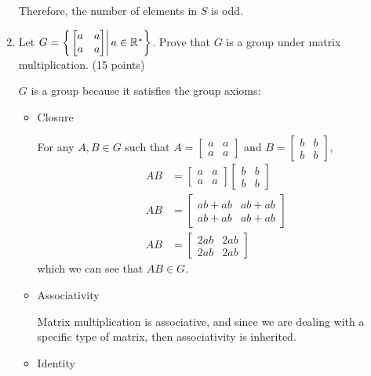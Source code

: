 \begin{enumerate}
    Therefore, the number of elements in \(S\) is odd.

    \item Let \(G = \left\{\left.\begin{bmatrix}
        a & a \\ a & a
    \end{bmatrix} \right| a\in \mathbb{R}^*\right\}\). Prove that \(G\) is a group under matrix multiplication. (15 points)

    \(G\) is a group because it satisfies the group axioms:
    \begin{itemize}
        \item Closure

        For any \(A,B\in G\) such that \(A = \begin{bmatrix}
            a & a \\ a & a
        \end{bmatrix}\) and \(B = \begin{bmatrix}
            b & b \\ b & b
        \end{bmatrix}\),
        \begin{align*}
            AB &= \begin{bmatrix}
                a & a \\ a & a
            \end{bmatrix}\begin{bmatrix}
                b & b \\ b & b
            \end{bmatrix} \\
            AB &= \begin{bmatrix}
                ab + ab & ab + ab \\ ab + ab & ab + ab
            \end{bmatrix} \\
            AB &= \begin{bmatrix}
                2ab & 2ab \\ 2ab & 2ab
            \end{bmatrix}
        \end{align*}
        which we can see that \(AB\in G\).

        \item Associativity

        Matrix multiplication is associative, and since we are dealing with a specific type of matrix, then associativity is inherited.

        \item Identity


\end{itemize}
\end{enumerate}
